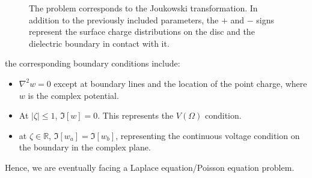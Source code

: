 \begin{figure}[H]
    \centering
    \caption{\small The problem corresponds to the Joukowski transformation. In addition to the previously included parameters, the $+$ and $-$ signs represent the surface charge distributions on the disc and the dielectric boundary in contact with it.}
    \label{fig: maped disc}
\end{figure}
the corresponding boundary conditions include:
\begin{itemize}

    \item $\nabla^2 w = 0$ except at boundary lines and the location of the point charge, where $w$ is the complex potential.
    
    \item At $|\zeta|\leq1$, $\Im [w]=0$. This represents the $V(\Omega)$ condition.
    
    \item at $\zeta\in\mathbb{R}$, $\Im [w_a]=\Im [w_b]$, representing the continuous voltage condition on the boundary in the complex plane.
    
\end{itemize}
Hence, we are eventually facing a Laplace equation/Poisson equation problem.
